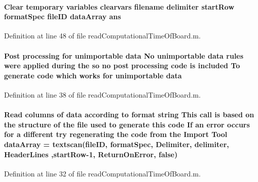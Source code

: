 \paragraph[{ans}]{\setlength{\rightskip}{0pt plus 5cm}Clear temporary variables clearvars {\bf filename} {\bf delimiter} {\bf start\+Row} {\bf format\+Spec} {\bf file\+I\+D} {\bf data\+Array} ans}\label{a00114_a7a2d374117d1db12f74214d95ead82a6}


Definition at line 48 of file read\+Computational\+Time\+Of\+Board.\+m.

\hypertarget{a00114_a32d7eebae6f15ceb9cc7f573d7dbd27d}{}
\paragraph[{data}]{\setlength{\rightskip}{0pt plus 5cm}Post processing for unimportable data No unimportable data rules were applied during the so no post processing code is included To generate code which works for unimportable data}\label{a00114_a32d7eebae6f15ceb9cc7f573d7dbd27d}


Definition at line 38 of file read\+Computational\+Time\+Of\+Board.\+m.

\hypertarget{a00114_a2234c02acb5c24b59c955753e6ef8441}{}
\paragraph[{data\+Array}]{\setlength{\rightskip}{0pt plus 5cm}Read {\bf columns} of {\bf data} according to format string This call is based on the structure of the {\bf file} used to generate this code If an error occurs for a different try regenerating the code from the Import Tool data\+Array = textscan({\bf file\+I\+D}, {\bf format\+Spec}, \textquotesingle{}Delimiter\textquotesingle{}, {\bf delimiter}, \textquotesingle{}Header\+Lines\textquotesingle{} ,{\bf start\+Row}-\/1, \textquotesingle{}Return\+On\+Error\textquotesingle{}, false)}\label{a00114_a2234c02acb5c24b59c955753e6ef8441}


Definition at line 32 of file read\+Computational\+Time\+Of\+Board.\+m.

